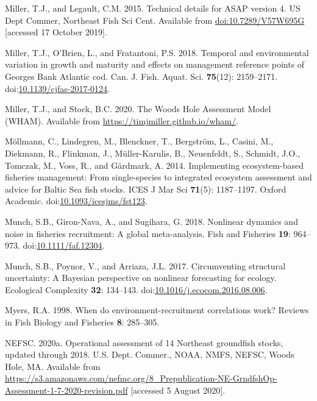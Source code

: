 \documentclass[]{article}
\begin{document}
\leavevmode\hypertarget{ref-miller2015Technical}{}%
Miller, T.J., and Legault, C.M. 2015. Technical details for ASAP version
4. US Dept Commer, Northeast Fish Sci Cent. Available from
\url{doi:10.7289/V57W695G} {[}accessed 17 October 2019{]}.

\leavevmode\hypertarget{ref-miller2018Temporal}{}%
Miller, T.J., O'Brien, L., and Fratantoni, P.S. 2018. Temporal and
environmental variation in growth and maturity and effects on management
reference points of Georges Bank Atlantic cod. Can. J. Fish. Aquat. Sci.
\textbf{75}(12): 2159--2171.
doi:\href{https://doi.org/10.1139/cjfas-2017-0124}{10.1139/cjfas-2017-0124}.

\leavevmode\hypertarget{ref-miller2020Woods}{}%
Miller, T.J., and Stock, B.C. 2020. The Woods Hole Assessment Model
(WHAM). Available from \url{https://timjmiller.github.io/wham/}.

\leavevmode\hypertarget{ref-mollmann2014Implementing}{}%
Möllmann, C., Lindegren, M., Blenckner, T., Bergström, L., Casini, M.,
Diekmann, R., Flinkman, J., Müller-Karulis, B., Neuenfeldt, S., Schmidt,
J.O., Tomczak, M., Voss, R., and Gårdmark, A. 2014. Implementing
ecosystem-based fisheries management: From single-species to integrated
ecosystem assessment and advice for Baltic Sea fish stocks. ICES J Mar
Sci \textbf{71}(5): 1187--1197. Oxford Academic.
doi:\href{https://doi.org/10.1093/icesjms/fst123}{10.1093/icesjms/fst123}.

\leavevmode\hypertarget{ref-munch2018Nonlinear}{}%
Munch, S.B., Giron-Nava, A., and Sugihara, G. 2018. Nonlinear dynamics
and noise in fisheries recruitment: A global meta-analysis. Fish and
Fisheries \textbf{19}: 964--973.
doi:\href{https://doi.org/10.1111/faf.12304}{10.1111/faf.12304}.

\leavevmode\hypertarget{ref-munch2017Circumventing}{}%
Munch, S.B., Poynor, V., and Arriaza, J.L. 2017. Circumventing
structural uncertainty: A Bayesian perspective on nonlinear forecasting
for ecology. Ecological Complexity \textbf{32}: 134--143.
doi:\href{https://doi.org/10.1016/j.ecocom.2016.08.006}{10.1016/j.ecocom.2016.08.006}.

\leavevmode\hypertarget{ref-myers1998When}{}%
Myers, R.A. 1998. When do environment-recruitment correlations work?
Reviews in Fish Biology and Fisheries \textbf{8}: 285--305.

\leavevmode\hypertarget{ref-nefsc2020Operational}{}%
NEFSC. 2020a. Operational assessment of 14 Northeast groundfish stocks,
updated through 2018. U.S. Dept. Commer., NOAA, NMFS, NEFSC, Woods Hole,
MA. Available from
\url{https://s3.amazonaws.com/nefmc.org/8_Prepublication-NE-GrndfshOp-Assessment-1-7-2020-revision.pdf}
{[}accessed 5 August 2020{]}.
\end{document}
